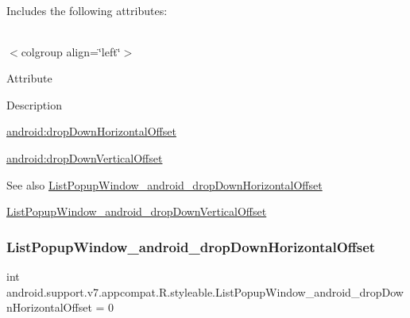 Includes the following attributes\+:

\tabulinesep=1mm
\begin{longtabu} spread 0pt [c]{*{0}{|X[-1]}|}
\hline
\end{longtabu}
$<$colgroup align=\char`\"{}left\char`\"{}$>$ 

Attribute

Description 

{\ttfamily \hyperlink{classandroid_1_1support_1_1v7_1_1appcompat_1_1R_1_1styleable_a7310828406501d85be84ef982c88d027}{android\+:drop\+Down\+Horizontal\+Offset}}

{\ttfamily \hyperlink{classandroid_1_1support_1_1v7_1_1appcompat_1_1R_1_1styleable_aaa07ae53bae27545095ffbee08f9777e}{android\+:drop\+Down\+Vertical\+Offset}}

\begin{DoxySeeAlso}{See also}
\hyperlink{classandroid_1_1support_1_1v7_1_1appcompat_1_1R_1_1styleable_a7310828406501d85be84ef982c88d027}{List\+Popup\+Window\+\_\+android\+\_\+drop\+Down\+Horizontal\+Offset} 

\hyperlink{classandroid_1_1support_1_1v7_1_1appcompat_1_1R_1_1styleable_aaa07ae53bae27545095ffbee08f9777e}{List\+Popup\+Window\+\_\+android\+\_\+drop\+Down\+Vertical\+Offset} 
\end{DoxySeeAlso}
\mbox{\label{classandroid_1_1support_1_1v7_1_1appcompat_1_1R_1_1styleable_a7310828406501d85be84ef982c88d027}} 
\subsubsection{\texorpdfstring{List\+Popup\+Window\+\_\+android\+\_\+drop\+Down\+Horizontal\+Offset}{ListPopupWindow\_android\_dropDownHorizontalOffset}}
{\footnotesize\ttfamily int android.\+support.\+v7.\+appcompat.\+R.\+styleable.\+List\+Popup\+Window\+\_\+android\+\_\+drop\+Down\+Horizontal\+Offset = 0\hspace{0.3cm}{\ttfamily [static]}}

